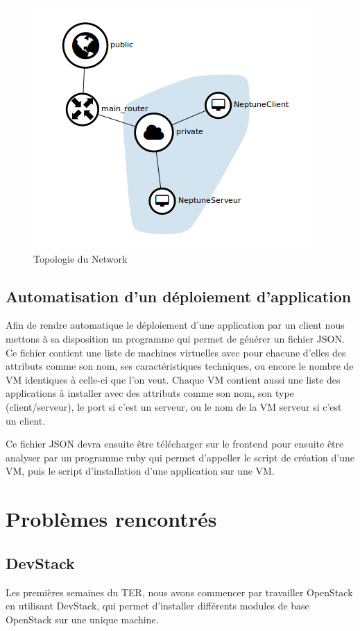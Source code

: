\documentclass{report}
\begin{document}
    \begin{figure}[ht]
        \centering{}\includegraphics[scale=0.75]{network-topo}
        \caption{Topologie du Network}
    \end{figure}


    \section{Automatisation d'un déploiement d'application}
        Afin de rendre automatique le déploiement d'une application par un client nous mettons à sa disposition un programme qui permet de générer un fichier JSON. Ce fichier contient une liste de machines virtuelles avec pour chacune d'elles des attributs comme son nom, ses caractéristiques techniques, ou encore le nombre de VM identiques à celle-ci que l'on veut. Chaque VM contient aussi une liste des applications à installer avec des attributs comme son nom, son type (client/serveur), le port si c'est un serveur, ou le nom de la VM serveur si c'est un client.\bigbreak
        
        Ce fichier JSON devra ensuite être télécharger sur le frontend pour ensuite être analyser par un programme ruby qui permet d'appeller le script de création d'une VM, puis le script d'installation d'une application sur une VM.\bigbreak
        
\chapter{Problèmes rencontrés}
    \section{DevStack}
        Les premières semaines du TER, nous avons commencer par travailler OpenStack en utilisant DevStack, 
        qui permet d'installer différents modules de base OpenStack sur une unique machine.\bigbreak
\end{document}
